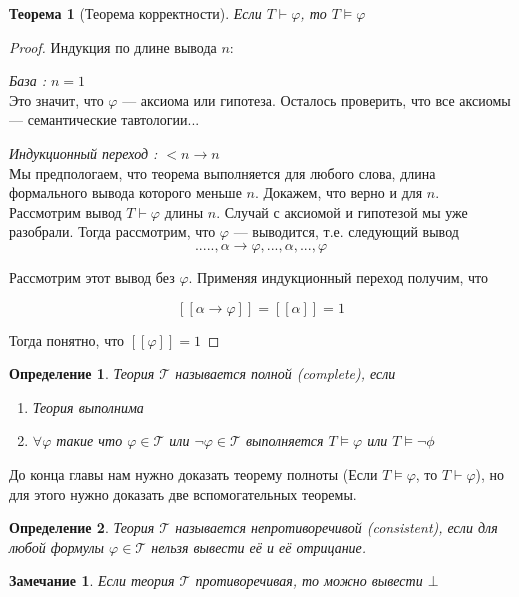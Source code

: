 \documentclass[12pt]{article}
\newtheorem{theorem}{Теорема}
\newtheorem{definition}{Определение}
\newtheorem{remark}{Замечание}
\begin{document}
\begin{theorem}[Теорема корректности]
	Если $T \vdash \varphi$, то $T \models \varphi$
\end{theorem}
\begin{proof}
	Индукция по длине вывода $n$:

	\textit{База : $n = 1$} \hfill \\
	Это значит, что $\varphi$ --- аксиома или гипотеза. Осталось проверить, что все аксиомы --- семантические тавтологии...

	\textit{Индукционный переход : $<n \to n$} \hfill \\
	Мы предпологаем, что теорема выполняется для любого слова, длина формального вывода которого меньше $n$.
	Докажем, что верно и для $n$. Рассмотрим вывод $T \vdash \varphi$ длины $n$.
	Случай с аксиомой и гипотезой мы уже разобрали. Тогда рассмотрим, что $\varphi$ --- выводится, т.е. следующий вывод
	\[ ....., \alpha \to \varphi, ..., \alpha, ..., \varphi\]

	Рассмотрим этот вывод без $\varphi$. Применяя индукционный переход получим, что

	\[ [\![ \alpha \to \varphi ]\!] = [\![ \alpha ]\!] = 1 \]

	Тогда понятно, что $[\![ \varphi ]\!] = 1$

\end{proof}

\begin{definition}
	Теория $\mathcal{T}$ называется полной (complete), если
	\begin{enumerate}
		\item Теория выполнима
		\item $\forall \varphi$ такие что $\varphi \in \mathcal{T}$ или $\lnot \varphi \in \mathcal{T}$ выполняется $T \models \varphi$ или $T \models \lnot \phi$
	\end{enumerate}
\end{definition}

До конца главы нам нужно доказать теорему полноты (Если $T \models \varphi$, то $T \vdash \varphi$), но для этого нужно доказать две вспомогательных теоремы.

\begin{definition}
	Теория $\mathcal{T}$ называется непротиворечивой (consistent), если
	для любой формулы $\varphi \in \mathcal{T}$ нельзя вывести её и её отрицание.
\end{definition}

\begin{remark}
	Если теория $\mathcal{T}$ противоречивая, то можно вывести $\bot$
\end{remark}
\end{document}
